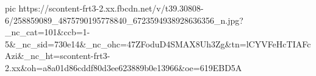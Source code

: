  
 
 
 
 

\ifcmt
  pic https://scontent-frt3-2.xx.fbcdn.net/v/t39.30808-6/258859089_4875790195778840_6723594938928636356_n.jpg?_nc_cat=101&ccb=1-5&_nc_sid=730e14&_nc_ohc=47ZFoduD4SMAX8Uh3Zg&tn=lCYVFeHcTIAFcAzi&_nc_ht=scontent-frt3-2.xx&oh=a8a01d86cddf80d3ee623889b0e13966&oe=619EBD5A
\fi

